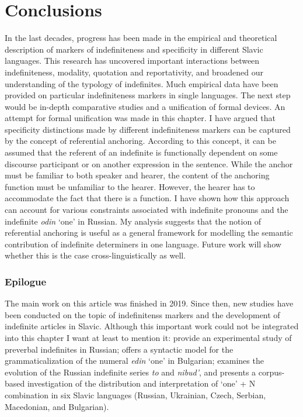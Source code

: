 \documentclass[output=paper,colorlinks,citecolor=brown]{langscibook}
\begin{document}
\section{Conclusions}\label{geist:sec:6}
\largerpage
In the last decades, progress has been made in the empirical and theoretical description of markers of indefiniteness and specificity in different Slavic languages. This research has uncovered important interactions between indefiniteness, mo\-da\-li\-ty, quotation and reportativity, and broadened our understanding of the typology of indefinites. Much empirical data have been provided on particular indefiniteness markers in single languages. The next step would be in-depth comparative studies and a unification of formal devices. An attempt for formal unification was made in this chapter. I have argued that specificity distinctions made by different indefiniteness markers can be captured by the concept of referential anchoring. According to this concept, it can be assumed that the referent of an indefinite is functionally dependent on some discourse participant or on another expression in the sentence. While the anchor must be familiar to both speaker and hearer, the content of the anchoring function must be unfamiliar to the hearer. However, the hearer has to accommodate the fact that there is a function. I have shown how this approach can account for various constraints associated with indefinite pronouns and the indefinite \textit{odin} `one' in Russian. My analysis suggests that the notion of referential anchoring is useful as a general framework for modelling the semantic contribution of indefinite determiners in one language. Future work will show whether this is the case cross-linguistically as well.

\subsubsection*{Epilogue}

The main work on this article was finished in 2019. Since then, new studies have been conducted on the topic of indefinitenss markers and the development of indefinite articles in Slavic. Although this important work could not be integrated into this chapter I want at least to mention it: \citet{Borik.etal2020} provide an experimental study of preverbal indefinites in Russian; \citet{Molinari2023,Molinari2025} offers a syntactic model for the grammaticalization of the numeral \textit{edin} ‘one’ in Bulgarian; \citet{Pekelis2023} examines the evolution of the Russian indefinite series \textit{to} and \textit{nibud’}, and \citet{Seres2024} presents a corpus-based investigation of the distribution and interpretation of ‘one’ + N combination in six Slavic languages (Russian, Ukrainian, Czech, Serbian, Macedonian, and Bulgarian).
\end{document}
